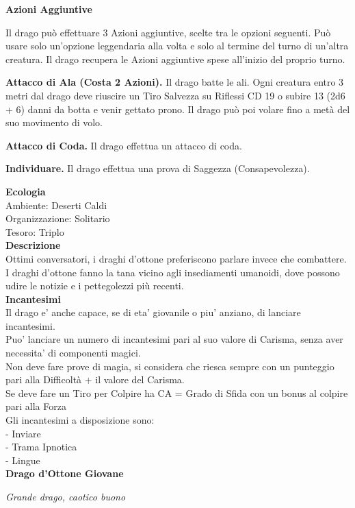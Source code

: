 \begin{multicols}{2}
\textbf{Azioni Aggiuntive}

Il drago può effettuare 3 Azioni aggiuntive, scelte tra le opzioni seguenti. Può usare solo un'opzione leggendaria alla volta e solo al termine del turno di un'altra creatura. Il drago recupera le Azioni aggiuntive spese all'inizio del proprio turno.

\textbf{Attacco di Ala (Costa 2 Azioni).} Il drago batte le ali. Ogni creatura entro 3 metri dal drago deve riuscire un Tiro Salvezza su Riflessi CD 19 o subire 13 (2d6 + 6) danni da botta e venir gettato  prono. Il drago può poi volare fino a metà del suo movimento di volo.

\textbf{Attacco di Coda.} Il drago effettua un attacco di coda. 

\textbf{Individuare.} Il drago effettua una prova di Saggezza (Consapevolezza).

\textbf{Ecologia}\\
Ambiente: Deserti Caldi\\
Organizzazione: Solitario\\
Tesoro: Triplo\\
\textbf{Descrizione}\\
Ottimi conversatori, i draghi d'ottone preferiscono parlare invece che combattere. I draghi d'ottone fanno la tana vicino agli insediamenti umanoidi, dove possono udire le notizie e i pettegolezzi più recenti.\\
\textbf{Incantesimi}\\
Il drago e' anche capace, se di eta' giovanile o piu' anziano, di lanciare incantesimi.\\
Puo' lanciare un numero di incantesimi pari al suo valore di Carisma, senza aver necessita' di componenti magici.\\
Non deve fare prove di magia, si considera che riesca sempre con un punteggio pari alla Difficoltà + il valore del Carisma.\\
Se deve fare un Tiro per Colpire ha CA = Grado di Sfida con un bonus al colpire pari alla Forza\\
Gli incantesimi a disposizione sono:\\
- Inviare\\
- Trama Ipnotica\\
- Lingue\\

\medskip{}\textbf{Drago d'Ottone Giovane}

\emph{Grande drago, caotico buono}


\end{multicols}
